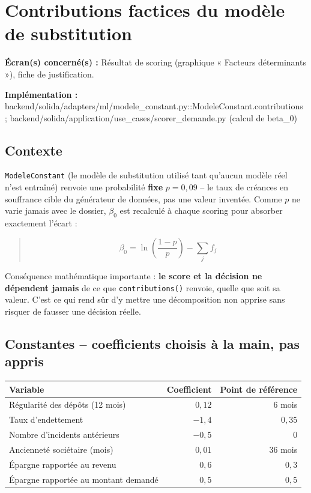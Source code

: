 \documentclass[11pt,a4paper]{article}
\newcommand{\brk}{\allowbreak}
\newcommand{\ecran}[1]{\noindent\textbf{Écran(s) concerné(s) :} #1\par}
\newcommand{\fichier}[1]{\noindent\textbf{Implémentation :} \tiny\ttfamily#1\normalfont\normalsize\par}
\newenvironment{formule}{\begin{quote}}{\end{quote}}
\begin{document}
\newpage

\section{Contributions factices du modèle de substitution}
\label{sec:contributions-factices}

\ecran{Résultat de scoring (graphique « Facteurs déterminants »), fiche de justification.}
\fichier{backend/\brk solida/\brk adapters/\brk ml/\brk modele\_constant.py::\brk{}ModeleConstant.contributions ;
backend/\brk solida/\brk application/\brk use\_cases/\brk scorer\_demande.py (calcul de beta\_0)}

\subsection*{Contexte}
\texttt{ModeleConstant} (le modèle de substitution utilisé tant qu'aucun modèle réel n'est
entraîné) renvoie une probabilité \textbf{fixe} $p = 0{,}09$ -- le taux de créances en souffrance
cible du générateur de données, pas une valeur inventée. Comme $p$ ne varie jamais avec le
dossier, $\beta_0$ est recalculé à chaque scoring pour absorber exactement l'écart :
\begin{formule}
\[
\beta_0 = \ln\!\left(\frac{1-p}{p}\right) - \sum_j f_j
\]
\end{formule}
Conséquence mathématique importante : \textbf{le score et la décision ne dépendent jamais} de ce
que \texttt{contributions()} renvoie, quelle que soit sa valeur. C'est ce qui rend sûr d'y mettre
une décomposition non apprise sans risquer de fausser une décision réelle.

\subsection*{Constantes -- coefficients choisis à la main, pas appris}

\begin{tabular}{@{}L{5.2cm}rr@{}}
\toprule
Variable & Coefficient & Point de référence \\
\midrule
Régularité des dépôts (12 mois) & $0{,}12$ & 6 mois \\
Taux d'endettement & $-1{,}4$ & $0{,}35$ \\
Nombre d'incidents antérieurs & $-0{,}5$ & $0$ \\
Ancienneté sociétaire (mois) & $0{,}01$ & 36 mois \\
Épargne rapportée au revenu & $0{,}6$ & $0{,}3$ \\
Épargne rapportée au montant demandé & $0{,}5$ & $0{,}5$ \\
\bottomrule
\end{tabular}
\end{document}
